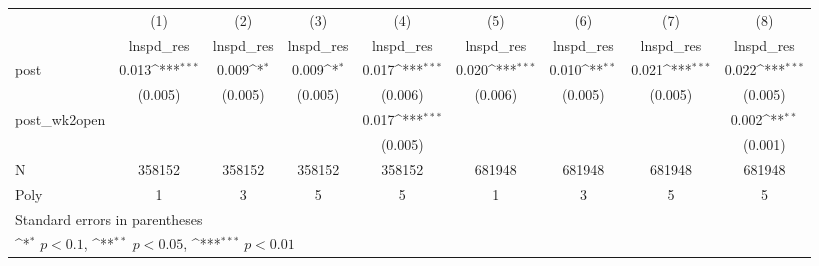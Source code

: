 {
\def\sym#1{\ifmmode^{#1}\else\(^{#1}\)\fi}
\begin{tabular}{l*{8}{c}}
\hline\hline
            &\multicolumn{1}{c}{(1)}&\multicolumn{1}{c}{(2)}&\multicolumn{1}{c}{(3)}&\multicolumn{1}{c}{(4)}&\multicolumn{1}{c}{(5)}&\multicolumn{1}{c}{(6)}&\multicolumn{1}{c}{(7)}&\multicolumn{1}{c}{(8)}\\
            &\multicolumn{1}{c}{lnspd\_res}&\multicolumn{1}{c}{lnspd\_res}&\multicolumn{1}{c}{lnspd\_res}&\multicolumn{1}{c}{lnspd\_res}&\multicolumn{1}{c}{lnspd\_res}&\multicolumn{1}{c}{lnspd\_res}&\multicolumn{1}{c}{lnspd\_res}&\multicolumn{1}{c}{lnspd\_res}\\
\hline
post        &  0.013\sym{***}&  0.009\sym{*}  &  0.009\sym{*}  &  0.017\sym{***}&  0.020\sym{***}&  0.010\sym{**} &  0.021\sym{***}&  0.022\sym{***}\\
            &(0.005)         &(0.005)         &(0.005)         &(0.006)         &(0.006)         &(0.005)         &(0.005)         &(0.005)         \\
[1em]
post\_wk2open&                &                &                &  0.017\sym{***}&                &                &                &  0.002\sym{**} \\
            &                &                &                &(0.005)         &                &                &                &(0.001)         \\
\hline
N           & 358152         & 358152         & 358152         & 358152         & 681948         & 681948         & 681948         & 681948         \\
Poly        &      1         &      3         &      5         &      5         &      1         &      3         &      5         &      5         \\
\hline\hline
\multicolumn{9}{l}{\footnotesize Standard errors in parentheses}\\
\multicolumn{9}{l}{\footnotesize \sym{*} \(p<0.1\), \sym{**} \(p<0.05\), \sym{***} \(p<0.01\)}\\
\end{tabular}
}
